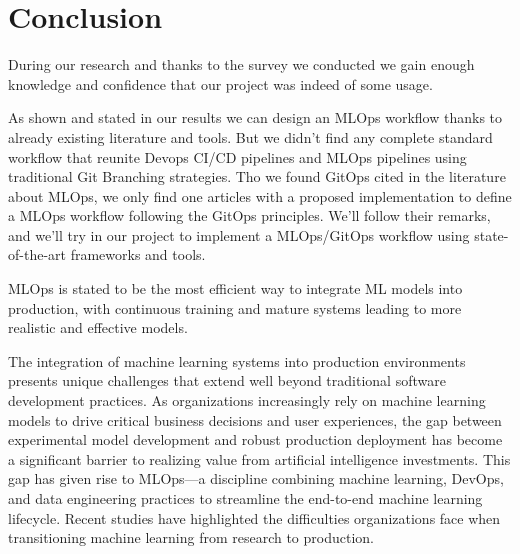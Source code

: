 \section{Conclusion}\label{sec:stconclusion}

During our research and thanks to the survey we conducted we gain enough knowledge and confidence that our project was indeed of some usage.

As shown and stated in our results we can design an MLOps workflow thanks to already existing literature and tools.
But we didn't find any complete standard workflow that reunite Devops CI/CD pipelines and MLOps pipelines using traditional Git Branching strategies.
Tho we found GitOps cited in the literature about MLOps, we only find one articles with a proposed implementation to define a MLOps workflow following the GitOps principles\cite{mlops-gitops}.
We'll follow their remarks, and we'll try in our project to implement a MLOps/GitOps workflow using state-of-the-art frameworks and tools.

MLOps is stated to be the most efficient way to integrate ML models into production, with continuous training and mature systems leading to more realistic and effective models.\cite{inproceedings}

The integration of machine learning systems into production environments presents unique challenges that extend well beyond traditional software development practices.
As organizations increasingly rely on machine learning models to drive critical business decisions and user experiences,
the gap between experimental model development and robust production deployment has become a significant barrier to realizing value from artificial intelligence investments\cite{Haakman2021}.
This gap has given rise to MLOps—a discipline combining machine learning, DevOps, and data engineering practices to streamline the end-to-end machine learning lifecycle\cite{Kreuzberger2022MachineLO}.
Recent studies have highlighted the difficulties organizations face when transitioning machine learning from research to production.
